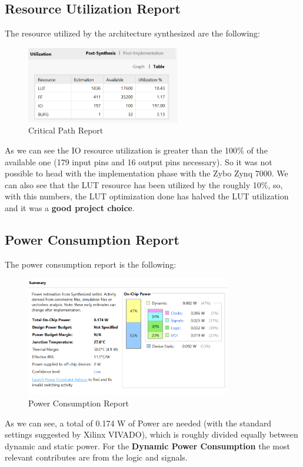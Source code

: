 \subsection{Resource Utilization Report}
The resource utilized by the architecture synthesized are the following:
\begin{figure}[H]
	\centering
	\includegraphics[width=0.6\textwidth]{img/vivado/utilization.png}
	\caption{Critical Path Report}
\end{figure}
As we can see the IO resource utilization is greater than the 100$\%$ of the available one (179 input pins and 16 output pins necessary). So it was not possible to head with the implementation phase with the Zybo Zynq 7000. We can also see that the LUT resource has been utilized by the roughly 10$\%$, so, with this numbers, the LUT optimization done has halved the LUT utilization and it was a \textbf{good project choice}.
\subsection{Power Consumption Report}
The power consumption report is the following:
\begin{figure}[H]
	\centering
	\includegraphics[width=0.8\textwidth]{img/vivado/power.png}
	\caption{Power Consumption Report}
\end{figure}
As we can see, a total of 0.174 W of Power are needed (with the standard settings suggested by Xilinx VIVADO), which is roughly divided equally between dynamic and static power. For the \textbf{Dynamic Power Consumption} the most relevant contributes are from the logic and signals.
